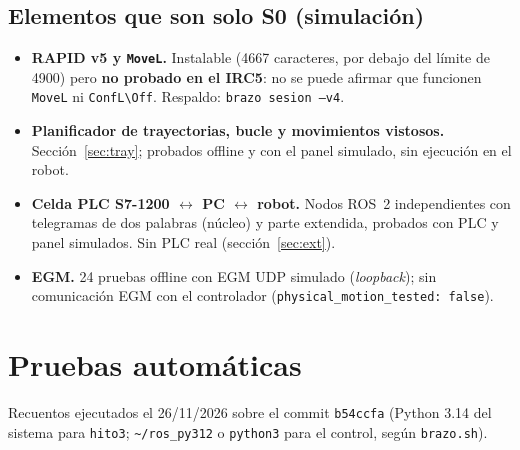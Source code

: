 \documentclass[10pt,a4paper]{article}
\begin{document}
\subsection{Elementos que son solo S0 (simulación)}
\begin{itemize}[leftmargin=*]
\item \textbf{RAPID v5 y \texttt{MoveL}.} Instalable (4667 caracteres, por debajo del límite de 4900) pero \textbf{no probado en el IRC5}: no se puede afirmar que funcionen \texttt{MoveL} ni \texttt{ConfL\textbackslash Off}. Respaldo: \texttt{brazo sesion --v4}.
\item \textbf{Planificador de trayectorias, bucle y movimientos vistosos.} Secci\'on~\ref{sec:tray}; probados offline y con el panel simulado, sin ejecución en el robot.
\item \textbf{Celda PLC S7-1200 $\leftrightarrow$ PC $\leftrightarrow$ robot.} Nodos ROS~2 independientes con telegramas de dos palabras (núcleo) y parte extendida, probados con PLC y panel simulados. Sin PLC real (sección~\ref{sec:ext}).
\item \textbf{EGM.} 24 pruebas offline con EGM UDP simulado (\textit{loopback}); sin comunicación EGM con el controlador (\texttt{physical\_motion\_tested: false}).
\end{itemize}

\section{Pruebas automáticas}
\label{sec:pruebas}

Recuentos ejecutados el 26/11/2026 sobre el commit \texttt{b54ccfa} (Python 3.14 del sistema para \texttt{hito3}; \texttt{\textasciitilde/ros\_py312} o \texttt{python3} para el control, según \texttt{brazo.sh}).
\end{document}
